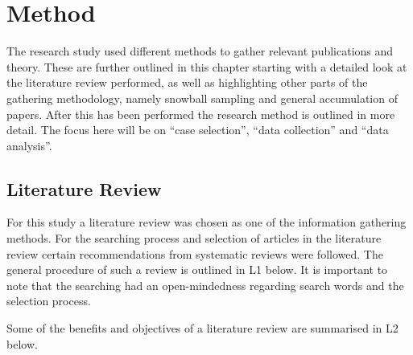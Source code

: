 \chapter{Method}

\minitoc

The research study used different methods to gather relevant publications and theory. These are further outlined in this chapter starting with a detailed look at the literature review performed, as well as highlighting other parts of the gathering methodology, namely snowball sampling and general accumulation of papers. After this has been performed the research method is outlined in more detail. The focus here will be on ``case selection'', ``data collection'' and ``data analysis''.

\newpage

\section{Literature Review}

For this study a literature review was chosen as one of the information gathering methods. For the searching process and selection of articles in the literature review certain recommendations from systematic reviews were followed. The general procedure of such a review is outlined in L1 below. It is important to note that the searching had an open-mindedness regarding search words and the selection process.

\vspace{0.5cm}


\vspace{0.5cm}

Some of the benefits and objectives of a literature review are summarised in L2 below.

\vspace{0.5cm}

